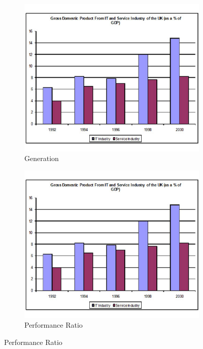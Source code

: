 \documentclass[18pt]{article}
\begin{document}
 
\begin{figure}
	\centering
	\begin{subfigure}[b]{0.3\textwidth}
		\centering
		\includegraphics[width=\textwidth]{figures/sample1.jpeg}
		\caption{Generation}
		\label{fig:y equals x}
	\end{subfigure}
\hfill
	\begin{subfigure}[b]{0.3\textwidth}
	\centering
	\includegraphics[width=\textwidth]{figures/sample1.jpeg}
	\caption{Performance Ratio}
	\label{fig:y equals x}

\end{subfigure}
\end{figure}
\end{document}
